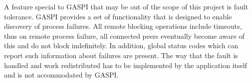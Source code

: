 A feature special to GASPI that may be out of the scope of this project is fault tolerance. GASPI provides a set of functionality that is designed to enable discovery of process failures. All remote blocking operations include timeouts, thus on remote process failure, all connected peers eventually become aware of this and do not block indefinitely.
In addition, global status codes which can report such information about failures are present. 
The way that the fault is handled and work redistributed has to be implemented by the application itself and is not accommodated by GASPI.
